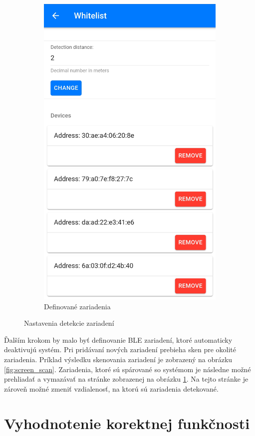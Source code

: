 \begin{figure}[!ht]
\begin{subfigure}{.4\textwidth}
      \includegraphics[width=.8\linewidth]{obrazky-figures/screen_whitelist.jpg}
      \caption{Definované zariadenia}
      \label{fig:screen_whitelist}
    \end{subfigure}
    \caption{Nastavenia detekcie zariadení}
    \label{fig:nastavenie_ble_zariadeni}
\end{figure}

Ďalším krokom by malo byť definovanie BLE zariadení, ktoré automaticky deaktivujú systém. Pri pridávaní nových zariadení prebieha sken pre okolité zariadenia. Príklad výsledku skenovania zariadení je zobrazený na obrázku \ref{fig:screen_scan}. Zariadenia, ktoré sú spárované so systémom je následne možné prehliadať a vymazávať na stránke zobrazenej na obrázku \ref{fig:screen_whitelist}. Na tejto stránke je zároveň možné zmeniť vzdialenosť, na ktorú sú zariadenia detekované.


\section{Vyhodnotenie korektnej funkčnosti}

